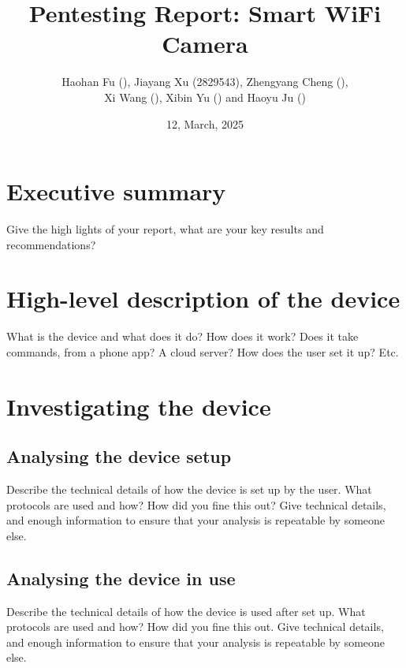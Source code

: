 \documentclass[11pt]{article}
\begin{document}
\title{Pentesting Report: Smart WiFi Camera}
\author{Haohan Fu (), Jiayang Xu (2829543), Zhengyang Cheng (),
\\ Xi Wang (), Xibin Yu () and Haoyu Ju ()}
\date{12, March, 2025}
\maketitle







\section{Executive summary}

Give the high lights of your report, what are your key results and recommendations?

\section{High-level description of the device}

What is the device and what does it do? How does it work? Does it take commands, from a phone app? A cloud server? How does the user set it up? Etc.

\section{Investigating the device}

\subsection{Analysing the device setup}

Describe the technical details of how the device is set up by the user. What protocols are used and how? How did you fine this out? Give technical details, and enough information to ensure that your analysis is repeatable by someone else.

\subsection{Analysing the device in use}

Describe the technical details of how the device is used after set up. What protocols are used and how? How did you fine this out. Give technical details, and enough information to ensure that your analysis is repeatable by someone else.
\end{document}
